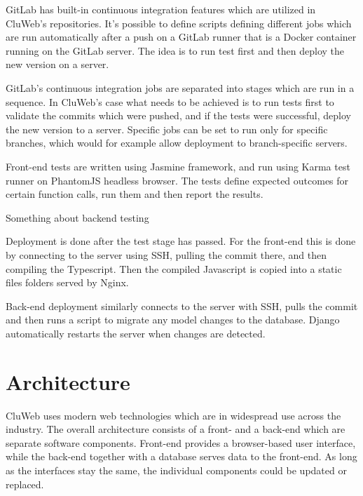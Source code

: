 GitLab has built-in continuous integration features which are utilized in CluWeb's repositories. It's possible to define scripts defining different jobs which are run automatically after a push on a GitLab runner that is a Docker container running on the GitLab server. The idea is to run test first and then deploy the new version on a server.

GitLab's continuous integration jobs are separated into stages which are run in a sequence. In CluWeb's case what needs to be achieved is to run tests first to validate the commits which were pushed, and if the tests were successful, deploy the new version to a server. Specific jobs can be set to run only for specific branches, which would for example allow deployment to branch-specific servers.

Front-end tests are written using Jasmine framework, and run using Karma test runner on PhantomJS headless browser. The tests define expected outcomes for certain function calls, run them and then report the results.

Something about backend testing

Deployment is done after the test stage has passed. For the front-end this is done by connecting to the server using SSH, pulling the commit there, and then compiling the Typescript. Then the compiled Javascript is copied into a static files folders served by Nginx.

Back-end deployment similarly connects to the server with SSH, pulls the commit and then runs a script to migrate any model changes to the database. Django automatically restarts the server when changes are detected.

\section{Architecture}
CluWeb uses modern web technologies which are in widespread use across the industry. The overall architecture consists of a front- and a back-end which are separate software components. Front-end provides a browser-based user interface, while the back-end together with a database serves data to the front-end. As long as the interfaces stay the same, the individual components could be updated or replaced.

